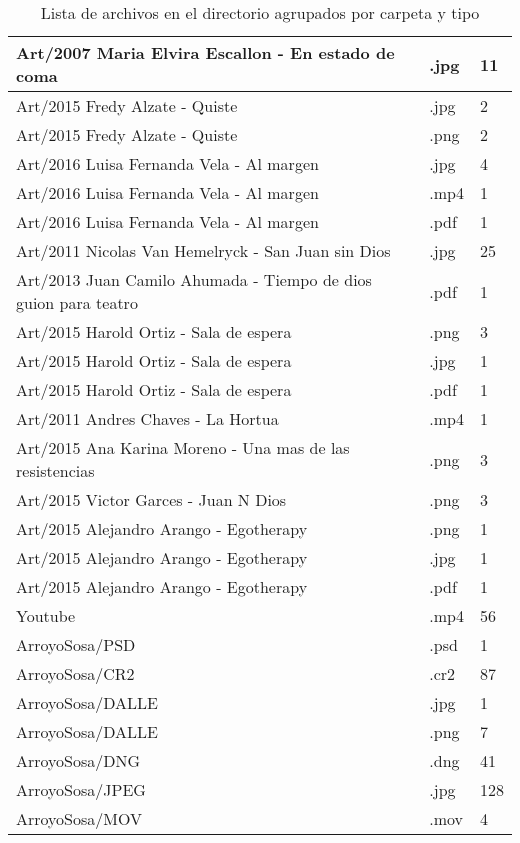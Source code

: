 \begin{table}[h!]
\begin{tabular}{|l|l|l|}
    \hline
    Art/2007 Maria Elvira Escallon - En estado de coma & .jpg & 11 \\
    \hline
    Art/2015 Fredy Alzate - Quiste & .jpg & 2 \\
    \hline
    Art/2015 Fredy Alzate - Quiste & .png & 2 \\
    \hline
    Art/2016 Luisa Fernanda Vela - Al margen & .jpg & 4 \\
    \hline
    Art/2016 Luisa Fernanda Vela - Al margen & .mp4 & 1 \\
    \hline
    Art/2016 Luisa Fernanda Vela - Al margen & .pdf & 1 \\
    \hline
    Art/2011 Nicolas Van Hemelryck - San Juan sin Dios & .jpg & 25 \\
    \hline
    Art/2013 Juan Camilo Ahumada - Tiempo de dios guion para teatro & .pdf & 1 \\
    \hline
    Art/2015 Harold Ortiz - Sala de espera & .png & 3 \\
    \hline
    Art/2015 Harold Ortiz - Sala de espera & .jpg & 1 \\
    \hline
    Art/2015 Harold Ortiz - Sala de espera & .pdf & 1 \\
    \hline
    Art/2011 Andres Chaves - La Hortua & .mp4 & 1 \\
    \hline
    Art/2015 Ana Karina Moreno - Una mas de las resistencias & .png & 3 \\
    \hline
    Art/2015 Victor Garces - Juan N Dios & .png & 3 \\
    \hline
    Art/2015 Alejandro Arango - Egotherapy & .png & 1 \\
    \hline
    Art/2015 Alejandro Arango - Egotherapy & .jpg & 1 \\
    \hline
    Art/2015 Alejandro Arango - Egotherapy & .pdf & 1 \\
    \hline
    Youtube & .mp4 & 56 \\
    \hline
    ArroyoSosa/PSD & .psd & 1 \\
    \hline
    ArroyoSosa/CR2 & .cr2 & 87 \\
    \hline
    ArroyoSosa/DALLE & .jpg & 1 \\
    \hline
    ArroyoSosa/DALLE & .png & 7 \\
    \hline
    ArroyoSosa/DNG & .dng & 41 \\
    \hline
    ArroyoSosa/JPEG & .jpg & 128 \\
    \hline
    ArroyoSosa/MOV & .mov & 4 \\
    \hline
    \end{tabular}
    \caption{Lista de archivos en el directorio agrupados por carpeta y tipo}
    \end{table}
    